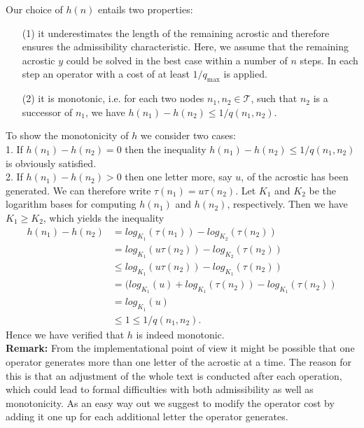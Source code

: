 \documentclass[11pt]{reportAlternative}
\begin{document}
Our choice of $h(n)$ entails two properties:

\begin{enumerate}

\item[(1)] it underestimates the length of the remaining acrostic and therefore ensures the admissibility characteristic. Here, we assume that the remaining acrostic $y$ could be solved in the best case within a number of $n$ steps. In each step an operator with a cost of at least $1/q_{\mathrm{max}}$ is applied.


\item[(2)] it is monotonic, i.e. for each two nodes $n_1,n_2\in\mathcal{T}$, such that $n_2$ is a successor of $n_1$, we have $h(n_1)-h(n_2)\le 1/q(n_1,n_2)$.


\end{enumerate}







To show the monotonicity of $h$ we consider two cases:\\
1. If $h(n_1)-h(n_2)=0$ then the inequality $h(n_1)-h(n_2)\le 1/q(n_1,n_2)$ is obviously satisfied.\\
2. If $h(n_1)-h(n_2)>0$ then one letter more, say $u$, of the acrostic has been generated. We can therefore write $\tau(n_1)=u\tau(n_2)$. Let $K_1$ and $K_2$ be the logarithm bases for computing $h(n_1)$ and $h(n_2)$, respectively. Then we have $K_1\ge K_2$, which yields the inequality
\begin{align*}
h(n_1)-h(n_2) &= log_{K_1}(\tau(n_1))-log_{K_2}(\tau(n_2))\\
			  &= log_{K_1}(u\tau(n_2))-log_{K_2}(\tau(n_2))\\
			  & \le log_{K_1}(u\tau(n_2))-log_{K_1}(\tau(n_2))\\
			  &= (log_{K_1}(u)+log_{K_1}(\tau(n_2))-log_{K_1}(\tau(n_2))\\
			  &= log_{K_1}(u) \\
			  & \le 1 \le 1/q(n_1,n_2).
\end{align*}
Hence we have verified that $h$ is indeed monotonic.\\


\textbf{Remark:} From the implementational point of view it might be possible that one operator generates more than one letter of the acrostic at a time. The reason for this is that an adjustment of the whole text is conducted after each operation, which could lead to formal difficulties with both admissibility as well as monotonicity. As an easy way out we suggest to modify the operator cost by adding it one up for each additional letter the operator generates.\\
\end{document}
